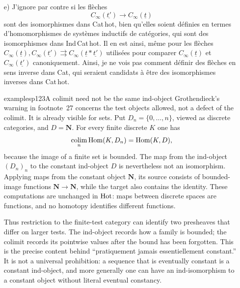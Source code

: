 \begin{enumerate}
Cette flèche induit un isomorphisme pour les objets correspondants de $\Hotz$; mais en regardant $H$ non comme ind-objet de $\Hotz$, mais prenant le foncteur $H_0$ induit sur $\Hot_0$ par le foncteur ind-représentable $H$ sur Hot. Ce foncteur induit est ‘représentable’ par l'objet $C_\infty$ de la catégorie plus grande
\[
H_0 \simeq C_\infty \qquad \text{dans } \Hotz.
\]

(Si le foncteur canonique $\Hot \longrightarrow \Hotz$ est pleinement fidèle, alors cette formule décrit $C_\infty$ comme objet de Hot, à isomorphisme unique près, en termes de $H_0$, donc aussi en termes de $H \in \mathrm{Ob\,Ind\,Cat\,hot}$.)

\item[e)] J'ignore par contre si les flèches
\[
C_\infty(\underline{t'}) \longrightarrow C_\infty(\underline{t})
\]
sont des isomorphismes dans Cat\,hot, bien qu'elles soient définies en termes d'homomorphismes de systèmes inductifs de catégories, qui sont des isomorphismes dans Ind\,Cat\,hot. Il en est ainsi, même pour les flèches $C_\infty(\underline{t}), C_\infty(\underline{t'}) \rightrightarrows C_\infty(\underline{t} * \underline{t'})$ utilisées pour comparer $C_\infty(\underline{t})$ et $C_\infty(\underline{t'})$ canoniquement. Ainsi, je ne vois pas comment définir des flèches en sens inverse dans Cat, qui seraient candidats à être des isomorphismes inverses dans Cat\,hot.

\begin{dcomment}{examples}{p123}{A colimit need not be the same ind-object}
Grothendieck's warning in footnote~27 concerns the test objects allowed, not a defect of the colimit. It is already visible for sets. Put $D_n=\{0,\ldots,n\}$, viewed as discrete categories, and $D=\mathbf N$. For every finite discrete $K$ one has
\[
 \mathop{\rm colim}_n\mathrm{Hom}(K,D_n)=\mathrm{Hom}(K,D),
\]
because the image of a finite set is bounded. The map from the ind-object $(D_n)_n$ to the constant ind-object $D$ is nevertheless not an isomorphism. Applying maps from the constant object $\mathbf N$, its source consists of bounded-image functions $\mathbf N\to\mathbf N$, while the target also contains the identity. These computations are unchanged in $\mathrm{Hot}$: maps between discrete spaces are functions, and no homotopy identifies different functions.

Thus restriction to the finite-test category can identify two presheaves that differ on larger tests. The ind-object records how a family is bounded; the colimit records its pointwise values after the bound has been forgotten. This is the precise content behind ``pratiquement jamais essentiellement constant.'' It is not a universal prohibition: a sequence that is eventually constant is a constant ind-object, and more generally one can have an ind-isomorphism to a constant object without literal eventual constancy.
\end{dcomment}



\end{enumerate}
